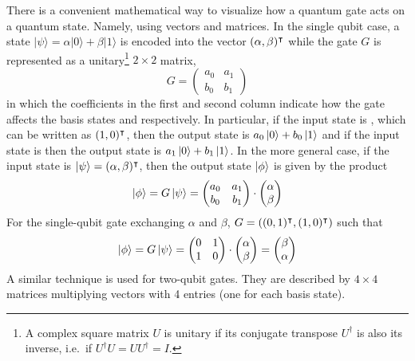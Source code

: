 There is a convenient mathematical way to visualize how a quantum gate acts on a quantum state. Namely, using vectors and matrices. In the single qubit case, a state $|\psi\rangle=\alpha|0\rangle+\beta|1\rangle$ is encoded into the vector $(\alpha, \beta)^\intercal$ while the gate $G$ is represented as a unitary\footnote{A complex square matrix $U$ is unitary if its conjugate transpose $U^\dagger$ is also its inverse, i.e.\ if $U^\dagger U=U U^\dagger=I$.} $2\times2$ matrix, 
\begin{equation}
G = 
\begin{pmatrix}
a_0 & a_1 \\
b_0 & b_1
\end{pmatrix}
\end{equation}
in which the coefficients in the first and second column indicate how the gate affects the basis states \0 and \1 respectively. In particular, if the input state is \0, which can be written as $ (1,0)^\intercal$, then the output state is $a_0\ket0 + b_0\ket1$ and if the input state is \1 then the output state is $a_1\ket0 + b_1\ket1$. In the more general case, if the input state is $\ket\psi = (\alpha, \beta)^\intercal$, then the output state $\ket\phi$ is given by the product
\begin{equation}
    \ket\phi = G \ket \psi = 
    \begin{pmatrix}
a_0 & a_1 \\
b_0 & b_1
\end{pmatrix} \cdot 
\begin{pmatrix}
\alpha \\
\beta 
\end{pmatrix}
\end{equation}
For the single-qubit gate exchanging $\alpha$ and $\beta$, $G = \left((0,1)^\intercal, (1,0)^\intercal\right)$ such that
\begin{equation}
\ket\phi = G \ket \psi = 
\begin{pmatrix}
0 & 1 \\
1 & 0
\end{pmatrix} \cdot 
\begin{pmatrix}
\alpha \\
\beta 
\end{pmatrix} =  
\begin{pmatrix}
\beta \\
\alpha 
\end{pmatrix}
\end{equation}
A similar technique is used for two-qubit gates. They are described by $4\times4$ matrices multiplying vectors with 4 entries (one for each basis state).

